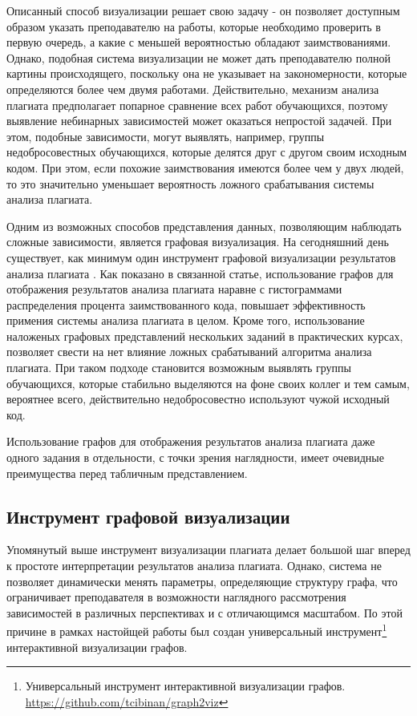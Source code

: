 \documentclass[a4paper,14pt]{extarticle}
\begin{document}
Описанный способ визуализации решает свою задачу - он позволяет доступным образом указать преподавателю на работы, которые необходимо проверить в первую очередь, а какие с меньшей вероятностью обладают заимствованиями. Однако, подобная система визуализации не может дать преподавателю полной картины происходящего, поскольку она не указывает на закономерности, которые определяются более чем двумя работами. Действительно, механизм анализа плагиата предполагает попарное сравнение всех работ обучающихся, поэтому выявление небинарных зависимостей может оказаться непростой задачей. При этом, подобные зависимости, могут выявлять, например, группы недобросовестных обучающихся, которые делятся друг с другом своим исходным кодом. При этом, если похожие заимствования имеются более чем у двух людей, то это значительно уменьшает вероятность ложного срабатывания системы анализа плагиата.

Одним из возможных способов представления данных, позволяющим наблюдать сложные зависимости, является графовая визуализация. На сегодняшний день существует, как минимум один инструмент графовой визуализации результатов анализа плагиата \citep{plagiarismGraph}. Как показано в связанной статье, использование графов для отображения результатов анализа плагиата наравне с гистограммами распределения процента заимствованного кода, повышает эффективность примения системы анализа плагиата в целом. Кроме того, использование наложеных графовых представлений нескольких заданий в практических курсах, позволяет свести на нет влияние ложных срабатываний алгоритма анализа плагиата. При таком подходе становится возможным выявлять группы обучающихся, которые стабильно выделяются на фоне своих коллег и тем самым, вероятнее всего, действительно недобросовестно используют чужой исходный код.

Использование графов для отображения результатов анализа плагиата даже одного задания в отдельности, с точки зрения наглядности, имеет очевидные преимущества перед табличным представлением.

\subsection{Инструмент графовой визуализации}

Упомянутый выше инструмент визуализации плагиата делает большой шаг вперед к простоте интерпретации результатов анализа плагиата. Однако, система не позволяет динамически менять параметры, определяющие структуру графа, что ограничивает преподавателя в возможности наглядного рассмотрения зависимостей в различных перспективах и с отличающимся масштабом. По этой причине в рамках настойщей работы был создан универсальный инструмент\footnote{Универсальный инструмент интерактивной визуализации графов. \url{https://github.com/tcibinan/graph2viz}} интерактивной визуализации графов.
\end{document}
